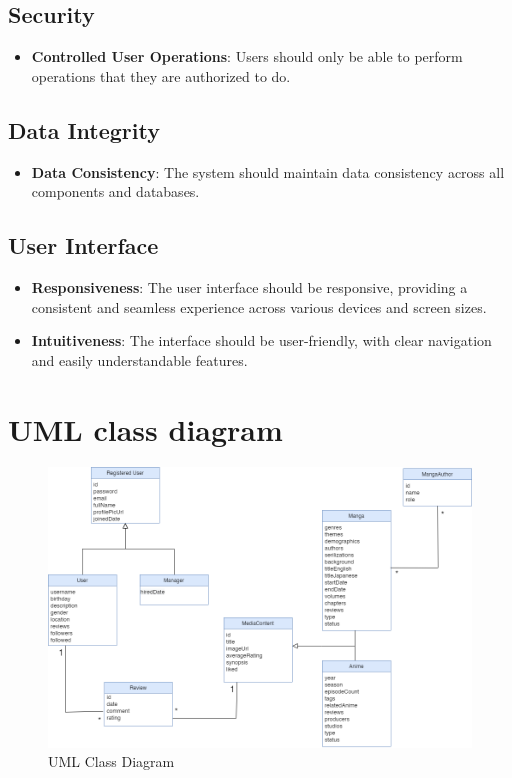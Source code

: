 \subsection*{Security}

\begin{itemize}
    \item \textbf{Controlled User Operations}: Users should only be able to perform operations that they are authorized to do.
\end{itemize}

\subsection*{Data Integrity}

\begin{itemize}
    \item \textbf{Data Consistency}: The system should maintain data consistency across all components and databases.
\end{itemize}

\subsection*{User Interface}

\begin{itemize}
    \item \textbf{Responsiveness}: The user interface should be responsive, providing a consistent and seamless experience across various devices and screen sizes.
    
    \item \textbf{Intuitiveness}: The interface should be user-friendly, with clear navigation and easily understandable features.
\end{itemize}

\section{UML class diagram}

\begin{figure}[h]
    \centering
    \includegraphics[width=\linewidth]{Media/Class Diagram.png}
    \caption{UML Class Diagram}\label{uml class diagram}
\end{figure}


